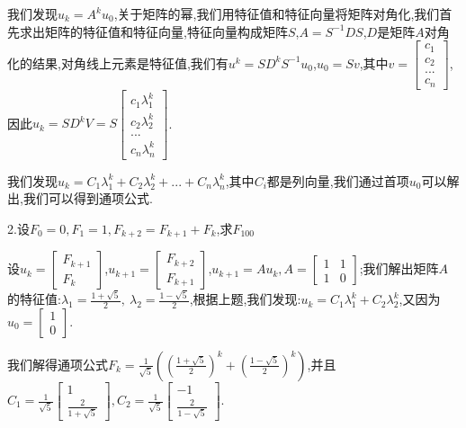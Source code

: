 \documentclass[oneside]{book}
\begin{document}
    我们发现$u_{k}=A^{k}u_{0}$,关于矩阵的幂,我们用特征值和特征向量将矩阵对角化,我们首先求出矩阵的特征值和特征向量,特征向量构成矩阵$S$,$A=S^{-1}DS$,$D$是矩阵$A$对角化的结果,对角线上元素是特征值,我们有$u^{k}=SD^{k}S^{-1}u_{0}$,$u_{0}=Sv$,其中$v=\left[\begin{array}{c}
    	c_{1}\\c_{2}\\...\\c_{n}
    \end{array}\right]$,因此$u_{k}=SD^{k}V=S\left[\begin{array}{c}
    c_{1}\lambda_{1}^{k}\\c_{2}\lambda_{2}^{k}\\...\\c_{n}\lambda_{n}^{k}
\end{array}\right]$.

我们发现$u_{k}=C_{1}\lambda_{1}^{k}+C_{2}\lambda_{2}^{k}+...+C_{n}\lambda_{n}^{k}$,其中$C_{i}$都是列向量,我们通过首项$u_{0}$可以解出,我们可以得到通项公式.


    2.设$F_{0}=0,F_{1}=1,F_{k+2}=F_{k+1}+F_{k}$,求$F_{100}$
    
    设$u_{k}=\left[\begin{array}{c}
    	F_{k+1}\\F_{k}
    \end{array}\right]$,$u_{k+1}=\left[\begin{array}{c}
    F_{k+2}\\F_{k+1}
\end{array}\right]$,$u_{k+1}=Au_{k},A=\left[\begin{array}{cc}
1&1\\1&0
\end{array}\right]$;我们解出矩阵$A$的特征值:$\lambda_{1}=\frac{1+\sqrt{5}}{2},\ \lambda_{2}=\frac{1-\sqrt{5}}{2}$,根据上题,我们发现:$u_{k}=C_{1}\lambda_{1}^{k}+C_{2}\lambda_{2}^{k}$,又因为$u_{0}=\left[\begin{array}{c}
1\\0
\end{array}\right]$.

我们解得通项公式$F_{k}=\frac{1}{\sqrt{5}}((\frac{1+\sqrt{5}}{2})^{k}+(\frac{1-\sqrt{5}}{2})^{k})$,并且$C_{1}=\frac{1}{\sqrt{5}}\left[\begin{array}{c}
	1\\\frac{2}{1+\sqrt{5}}
\end{array}\right],C_{2}=\frac{1}{\sqrt{5}}\left[\begin{array}{c}
-1\\\frac{2}{1-\sqrt{5}}
\end{array}\right]$.
\end{document}

